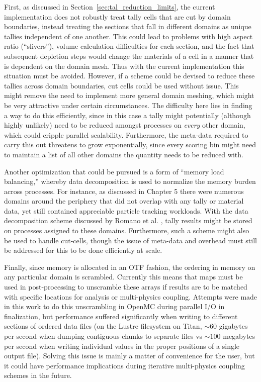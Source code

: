 First, as discussed in Section~\ref{sec:tal_reduction_limits}, the current
implementation does not robustly treat tally cells that are cut by domain
boundaries, instead treating the sections that fall in different domains as
unique tallies independent of one another. This could lead to problems with high
aspect ratio (``slivers''), volume calculation difficulties for each section, and
the fact that subsequent depletion steps would change the materials of a cell in a
manner that is dependent on the domain mesh. Thus with the current
implementation this situation must be avoided. However, if a scheme could be
devised to reduce these tallies across domain boundaries, cut cells could be used
without issue. This might remove the need to implement more general domain
meshing, which might be very attractive under certain circumstances. The
difficulty here lies in finding a way to do this efficiently, since in this case
a tally might potentially (although highly unlikely) need to be reduced amongst
processes on \emph{every} other domain, which could cripple parallel
scalability. Furthermore, the meta-data required to carry this out threatens to
grow exponentially, since every scoring bin might need to maintain a list of all
other domains the quantity needs to be reduced with.

Another optimization that could be pursued is a form of ``memory load
balancing,'' whereby data decomposition is used to normalize the memory burden
across processes. For instance, as discussed in Chapter 5 there were numerous
domains around the periphery that did not overlap with any tally or material
data, yet still contained appreciable particle tracking workloads. With the data
decomposition scheme discussed by Romano et al. \cite{Romano201320,
romano_talserver_paris}, tally results might be stored on processes assigned to
these domains. Furthermore, such a scheme might also be used to handle
cut-cells, though the issue of meta-data and overhead must still be addressed
for this to be done efficiently at scale.

Finally, since memory is allocated in an OTF fashion, the ordering in memory on
any particular domain is scrambled. Currently this means that maps must be used
in post-processing to unscramble these arrays if results are to be matched with
specific locations for analysis or multi-physics coupling. Attempts were made in
this work to do this unscrambling in OpenMC during parallel I/O in finalization,
but performance suffered significantly when writing to different sections of
ordered data files (on the Lustre filesystem on Titan, $\sim 60$ gigabytes per
second when dumping contiguous chunks to separate files vs $\sim 100$ megabytes
per second when writing individual values in the proper positions of a single
output file). Solving this issue is mainly a matter of convenience for the user,
but it could have performance implications during iterative multi-physics
coupling schemes in the future.

